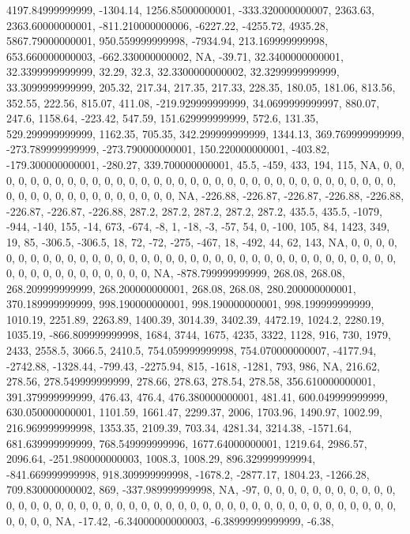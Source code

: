 \documentclass[
]{article}
\begin{document}
4197.84999999999, -1304.14, 1256.85000000001, -333.320000000007,
2363.63, 2363.60000000001, -811.210000000006, -6227.22, -4255.72,
4935.28, 5867.79000000001, 950.559999999998, -7934.94, 213.169999999998,
653.660000000003, -662.330000000002, NA, -39.71, 32.3400000000001,
32.3399999999999, 32.29, 32.3, 32.3300000000002, 32.3299999999999,
33.3099999999999, 205.32, 217.34, 217.35, 217.33, 228.35, 180.05,
181.06, 813.56, 352.55, 222.56, 815.07, 411.08, -219.929999999999,
34.0699999999997, 880.07, 247.6, 1158.64, -223.42, 547.59,
151.629999999999, 572.6, 131.35, 529.299999999999, 1162.35, 705.35,
342.299999999999, 1344.13, 369.769999999999, -273.789999999999,
-273.790000000001, 150.220000000001, -403.82, -179.300000000001,
-280.27, 339.700000000001, 45.5, -459, 433, 194, 115, NA, 0, 0, 0, 0, 0,
0, 0, 0, 0, 0, 0, 0, 0, 0, 0, 0, 0, 0, 0, 0, 0, 0, 0, 0, 0, 0, 0, 0, 0,
0, 0, 0, 0, 0, 0, 0, 0, 0, 0, 0, 0, 0, 0, 0, 0, 0, 0, 0, NA, -226.88,
-226.87, -226.87, -226.88, -226.88, -226.87, -226.87, -226.88, 287.2,
287.2, 287.2, 287.2, 287.2, 435.5, 435.5, -1079, -944, -140, 155, -14,
673, -674, -8, 1, -18, -3, -57, 54, 0, -100, 105, 84, 1423, 349, 19, 85,
-306.5, -306.5, 18, 72, -72, -275, -467, 18, -492, 44, 62, 143, NA, 0,
0, 0, 0, 0, 0, 0, 0, 0, 0, 0, 0, 0, 0, 0, 0, 0, 0, 0, 0, 0, 0, 0, 0, 0,
0, 0, 0, 0, 0, 0, 0, 0, 0, 0, 0, 0, 0, 0, 0, 0, 0, 0, 0, 0, 0, 0, 0, NA,
-878.799999999999, 268.08, 268.08, 268.209999999999, 268.200000000001,
268.08, 268.08, 280.200000000001, 370.189999999999, 998.190000000001,
998.190000000001, 998.199999999999, 1010.19, 2251.89, 2263.89, 1400.39,
3014.39, 3402.39, 4472.19, 1024.2, 2280.19, 1035.19, -866.809999999998,
1684, 3744, 1675, 4235, 3322, 1128, 916, 730, 1979, 2433, 2558.5,
3066.5, 2410.5, 754.059999999998, 754.070000000007, -4177.94, -2742.88,
-1328.44, -799.43, -2275.94, 815, -1618, -1281, 793, 986, NA, 216.62,
278.56, 278.549999999999, 278.66, 278.63, 278.54, 278.58,
356.610000000001, 391.379999999999, 476.43, 476.4, 476.380000000001,
481.41, 600.049999999999, 630.050000000001, 1101.59, 1661.47, 2299.37,
2006, 1703.96, 1490.97, 1002.99, 216.969999999998, 1353.35, 2109.39,
703.34, 4281.34, 3214.38, -1571.64, 681.639999999999, 768.549999999996,
1677.64000000001, 1219.64, 2986.57, 2096.64, -251.980000000003, 1008.3,
1008.29, 896.329999999994, -841.669999999998, 918.309999999998, -1678.2,
-2877.17, 1804.23, -1266.28, 709.830000000002, 869, -337.989999999998,
NA, -97, 0, 0, 0, 0, 0, 0, 0, 0, 0, 0, 0, 0, 0, 0, 0, 0, 0, 0, 0, 0, 0,
0, 0, 0, 0, 0, 0, 0, 0, 0, 0, 0, 0, 0, 0, 0, 0, 0, 0, 0, 0, 0, 0, 0, 0,
0, 0, NA, -17.42, -6.34000000000003, -6.38999999999999, -6.38,
\end{document}
